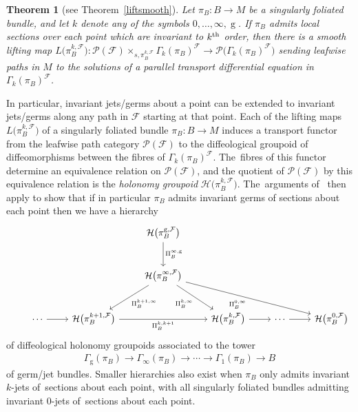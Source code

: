 \documentclass[10pt,a4paper]{amsart}
\numberwithin{equation}{section}
\newtheorem{Theorem}{Theorem}[section]
\def\g{\operatorname{g}}
\def\FF{{\mathcal{F}}}
\def\HH{{\mathcal{H}}}
\def\PP{{\mathcal{P}}}
\begin{document}
\begin{Theorem}[see Theorem~\ref{liftsmooth}]
Let $\pi_{B}\colon B\rightarrow M$ be a singularly foliated bundle, and let $k$ denote any of the symbols $0,\dots,\infty,\g$. If $\pi_{B}$ admits local sections over each point which are invariant to $k^{\rm th}$ order, then there is a smooth lifting map $L\big(\pi_{B}^{k,\FF}\big)\colon \PP(\FF)\times_{s,\pi_{B}^{k,\FF}}\Gamma_{k}(\pi_{B})^{\FF}\rightarrow \PP\big(\Gamma_{k}(\pi_{B})^{\FF}\big)$ sending leafwise paths in $M$ to the solutions of a parallel transport differential equation in $\Gamma_{k}(\pi_{B})^{\FF}$.
\end{Theorem}

In particular, invariant jets/germs about a point can be extended to invariant jets/germs along any path in $\FF$ starting at that point. Each of the lifting maps $L\big(\pi_{B}^{k,\FF}\big)$ of a singularly foliated bundle $\pi_{B}\colon B\rightarrow M$ induces a transport functor from the leafwise path category $\PP(\FF)$ to the diffeological groupoid of diffeomorphisms between the fibres of $\Gamma_{k}(\pi_{B})^{\FF}$. The~fibres of this functor determine an equivalence relation on $\PP(\FF)$, and the quotient of $\PP(\FF)$ by this equivalence relation is the \textit{holonomy groupoid} $\HH\big(\pi_{B}^{k,\FF}\big)$. The~arguments of~\cite[Theorem~5.15]{mac3} then apply to show that if in particular $\pi_{B}$ admits invariant germs of sections about each point then we have a hierarchy
\begin{equation}\label{hierintro}
\begin{tikzcd}[row sep = large]
& & & \HH\big(\pi_{B}^{\g,\FF}\big) \ar[d,"\Pi_{B}^{\infty,\g}"] & & & \\ & & & \HH\big(\pi_{B}^{\infty,\FF}\big) \ar[dl,"\Pi_{B}^{k+1,\infty}"] \ar[dr,"\Pi_{B}^{k,\infty}"'] \ar[drrr,"\Pi_{B}^{0,\infty}"'] & & &\\ & \cdots\ar[r] & \HH\big(\pi_{B}^{k+1,\FF}\big) \ar[rr,"\Pi_{B}^{k,k+1}"'] & & \HH\big(\pi_{B}^{k,\FF}\big) \ar[r] & \cdots \ar[r] & \HH\big(\pi_{B}^{0,\FF}\big)
\end{tikzcd}
\end{equation}
of diffeological holonomy groupoids associated to the tower
\begin{gather*}
\Gamma_{\g}(\pi_{B})\rightarrow\Gamma_{\infty}(\pi_{B})\rightarrow\cdots\rightarrow \Gamma_{1}(\pi_{B})\rightarrow B
\end{gather*}
of germ/jet bundles. Smaller hierarchies also exist when $\pi_{B}$ only admits invariant $k$-jets of~sections about each point, with all singularly foliated bundles admitting invariant $0$-jets of~sections about each point.
\end{document}
